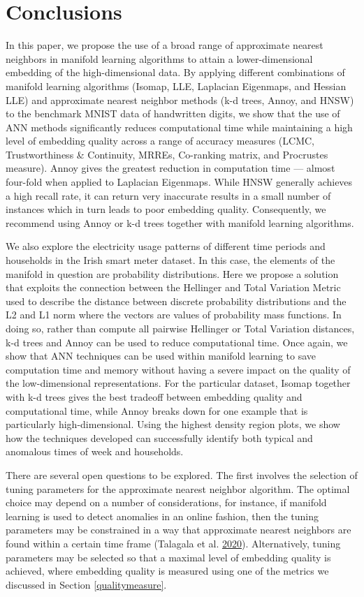\documentclass[12pt]{article}
\begin{document}
\hypertarget{conclusion}{%
\section{Conclusions}\label{conclusion}}

In this paper, we propose the use of a broad range of approximate nearest neighbors in manifold learning algorithms to attain a lower-dimensional embedding of the high-dimensional data. By applying different combinations of manifold learning algorithms (Isomap, LLE, Laplacian Eigenmaps, and Hessian LLE) and approximate nearest neighbor methods (k-d trees, Annoy, and HNSW) to the benchmark MNIST data of handwritten digits, we show that the use of ANN methods significantly reduces computational time while maintaining a high level of embedding quality across a range of accuracy measures (LCMC, Trustworthiness \& Continuity, MRREs, Co-ranking matrix, and Procrustes measure). Annoy gives the greatest reduction in computation time --- almost four-fold when applied to Laplacian Eigenmaps. While HNSW generally achieves a high recall rate, it can return very inaccurate results in a small number of instances which in turn leads to poor embedding quality. Consequently, we recommend using Annoy or k-d trees together with manifold learning algorithms.

We also explore the electricity usage patterns of different time periods and households in the Irish smart meter dataset. In this case, the elements of the manifold in question are probability distributions. Here we propose a solution that exploits the connection between the Hellinger and Total Variation Metric used to describe the distance between discrete probability distributions and the L2 and L1 norm where the vectors are values of probability mass functions. In doing so, rather than compute all pairwise Hellinger or Total Variation distances, k-d trees and Annoy can be used to reduce computational time.
Once again, we show that ANN techniques can be used within manifold learning to save computation time and memory without having a severe impact on the quality of the low-dimensional representations. For the particular dataset, Isomap together with k-d trees gives the best tradeoff between embedding quality and computational time, while Annoy breaks down for one example that is particularly high-dimensional. Using the highest density region plots, we show how the techniques developed can successfully identify both typical and anomalous times of week and households.

There are several open questions to be explored. The first involves the selection of tuning parameters for the approximate nearest neighbor algorithm. The optimal choice may depend on a number of considerations, for instance, if manifold learning is used to detect anomalies in an online fashion, then the tuning parameters may be constrained in a way that approximate nearest neighbors are found within a certain time frame (Talagala et al. \protect\hyperlink{ref-Talagala2020}{2020}). Alternatively, tuning parameters may be selected so that a maximal level of embedding quality is achieved, where embedding quality is measured using one of the metrics we discussed in Section \ref{qualitymeasure}.
\end{document}

